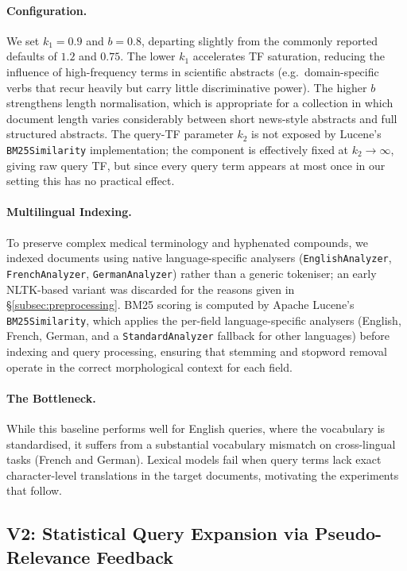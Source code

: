 \paragraph{Configuration.}
We set $k_1=0.9$ and $b=0.8$, departing slightly from the commonly
reported defaults of $1.2$ and $0.75$.  The lower $k_1$ accelerates
TF saturation, reducing the influence of high-frequency terms in
scientific abstracts (e.g.\ domain-specific verbs that recur heavily
but carry little discriminative power).  The higher $b$ strengthens
length normalisation, which is appropriate for a collection in which
document length varies considerably between short news-style
abstracts and full structured abstracts.  The query-TF parameter
$k_2$ is not exposed by Lucene's \texttt{BM25Similarity}
implementation; the component is effectively fixed at
$k_2\!\to\!\infty$, giving raw query TF, but since every query term
appears at most once in our setting this has no practical effect.

\paragraph{Multilingual Indexing.}
To preserve complex medical terminology and hyphenated compounds, we
indexed documents using native language-specific analysers
(\texttt{EnglishAnalyzer}, \texttt{FrenchAnalyzer},
\texttt{GermanAnalyzer}) rather than a generic tokeniser; an early
NLTK-based variant was discarded for the reasons given in
\S\ref{subsec:preprocessing}.  BM25 scoring is computed by Apache
Lucene's \texttt{BM25Similarity}, which applies the per-field
language-specific analysers (English, French, German, and a
\texttt{StandardAnalyzer} fallback for other languages) before
indexing and query processing, ensuring that stemming and stopword
removal operate in the correct morphological context for each field.

\paragraph{The Bottleneck.}
While this baseline performs well for English queries, where the
vocabulary is standardised, it suffers from a substantial vocabulary
mismatch on cross-lingual tasks (French and German).  Lexical models
fail when query terms lack exact character-level translations in the
target documents, motivating the experiments that follow.

\subsection{V2: Statistical Query Expansion via Pseudo-Relevance Feedback}
\label{subsec:methodology_v2}

